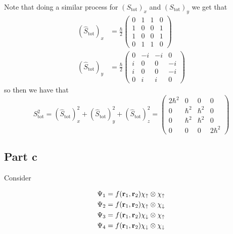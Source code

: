 \documentclass[12pt]{report}
\theoremstyle{custom}
\newcommand{\rb}{\bold{r}}
\begin{document}
Note that doing a similar process for $(S_{\text{tot}})_x$ and $(S_{\text{tot}})_y$ we get that
\begin{align*}
  (\hat{S}_{\text{tot}})_x &= \frac{\hbar}{2} \begin{pmatrix}0 & 1 & 1 & 0 \\ 1 & 0 & 0 & 1 \\ 1 & 0 & 0 & 1 \\ 0 & 1 & 1 & 0 \end{pmatrix} \\
(\hat{S}_{\text{tot}})_y &= \frac{\hbar}{2} \begin{pmatrix} 0 & -i & -i & 0 \\ i & 0 & 0 & -i \\ i & 0 & 0 & -i \\ 0 & i & i & 0\end{pmatrix}
\end{align*}
so then we have that
\begin{equation*}
S_{\text{tot}}^2 = (\hat{S}_{\text{tot}})_x^2 + (\hat{S}_{\text{tot}})_y^2 + (\hat{S}_{\text{tot}})_z^2 = \begin{pmatrix}2\hbar^2 & 0 & 0 & 0 \\ 0 & \hbar^2 & \hbar^2 & 0 \\ 0 & \hbar^2 & \hbar^2 & 0 \\ 0 & 0 & 0 & 2\hbar^2\end{pmatrix} 
\end{equation*}
\subsection*{Part c} 
Consider

\begin{align*}
  \Psi_1 &= f(\rb_1,\rb_2) \chi_{\uparrow} \otimes \chi_{\uparrow} \\
  \Psi_2 &= f(\rb_1,\rb_2) \chi_{\uparrow} \otimes \chi_{\downarrow} \\
  \Psi_3 &= f(\rb_1,\rb_2) \chi_{\downarrow} \otimes \chi_{\uparrow} \\
  \Psi_4 &= f(\rb_1,\rb_2) \chi_{\downarrow} \otimes \chi_{\downarrow} 
\end{align*}
\end{document}
